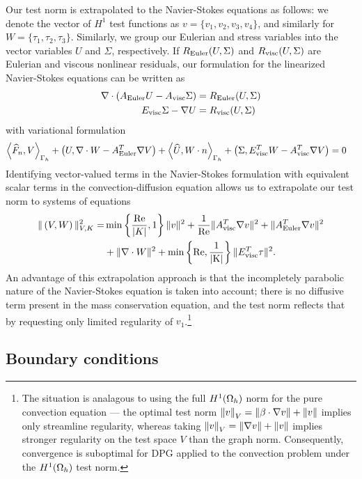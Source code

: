 Our test norm is extrapolated to the Navier-Stokes equations as follows: we denote the vector of $H^1$ test functions as $v=\{v_1,v_2,v_3,v_4\}$, and similarly for $W = \{\tau_1,\tau_2,\tau_3\}$. Similarly, we group our Eulerian and stress variables into the vector variables $U$ and $\Sigma$, respectively. If $R_{\rm Euler}(U,\Sigma)$ and $R_{\rm visc}(U,\Sigma)$ are Eulerian and viscous nonlinear residuals, our formulation for the linearized Navier-Stokes equations can be written as
\begin{align*}
\div \left(A_{\rm Euler}U - A_{\rm visc}\Sigma\right) &= R_{\rm Euler}(U,\Sigma)\\
E_{\rm visc} \Sigma - \grad U &= R_{\rm visc}(U,\Sigma)
\end{align*}
with variational formulation
\begin{align*}
\LRa{\widehat{F}_n,V}_{\Gh} + \left(U,\div W - A_{\rm Euler}^T\grad  V\right) + \LRa{\widehat{U},W\cdot n}_{\Gh} + \left(\Sigma,E_{\rm visc}^TW - A_{\rm visc}^T\grad  V\right) &= 0
\end{align*}
Identifying vector-valued terms in the Navier-Stokes formulation with equivalent scalar terms in the convection-diffusion equation allows us to extrapolate our test norm to systems of equations
\begin{align*}
\|\left(V,W\right)\|_{V,K}^2 =& \min\left\{\frac{\Reyn}{|K|},1\right\}\|v\|^2 + \frac{1}{\Reyn} \|A_{\rm visc}^T\grad v\|^2 + \|A_{\rm Euler}^T \grad v\|^2 \\
& + \| \div W\|^2 + \min\left\{\Reyn,\frac{1}{|K|}\right\}\|E_{\rm visc}^T\tau\|^2.
\end{align*}
An advantage of this extrapolation approach is that the incompletely parabolic nature of the Navier-Stokes equation is taken into account; there is no diffusive term present in the mass conservation equation, and the test norm reflects that by requesting only limited regularity of $v_1$.\footnote{The situation is analagous to using the full $H^1(\Oh)$ norm for the pure convection equation --- the optimal test norm $\nor{v}_V = \nor{\beta\cdot \grad v} + \nor{v}$ implies only streamline regularity, whereas taking $\nor{v}_V = \nor{\grad v} + \nor{v}$ implies stronger regularity on the test space $V$ than the graph norm. Consequently, convergence is suboptimal for DPG applied to the convection problem under the $H^1(\Oh)$ test norm.}

\subsection{Boundary conditions}

